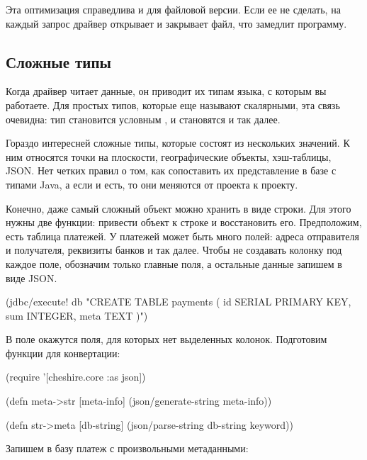 Эта оптимизация справедлива и для файловой версии. Если ее не сделать, на каждый запрос драйвер открывает и закрывает файл, что замедлит программу.

\subsection{Сложные типы}

Когда драйвер читает данные, он приводит их типам языка, с которым вы работаете. Для простых типов, которые еще называют скалярными, эта связь очевидна: тип  становится условным ,  и  становятся  и так далее.

Гораздо интересней сложные типы, которые состоят из нескольких значений. К ним относятся точки на плоскости, географические объекты, хэш-таблицы, JSON. Нет четких правил о том, как сопоставить их представление в базе с типами Java, а если и есть, то они меняются от проекта к проекту.

Конечно, даже самый сложный объект можно хранить в виде строки. Для этого нужны две функции: привести объект к строке и восстановить его. Предположим, есть таблица платежей. У платежей может быть много полей: адреса отправителя и получателя, реквизиты банков и так далее. Чтобы не создавать колонку под каждое поле, обозначим только главные поля, а остальные данные запишем в виде JSON.

\begin{english}
  \begin{clojure}
(jdbc/execute! db "CREATE TABLE payments (
  id SERIAL PRIMARY KEY,
  sum INTEGER,
  meta TEXT
)")
  \end{clojure}
\end{english}

В поле  окажутся поля, для которых нет выделенных колонок. Подготовим функции для конвертации:

\begin{english}
  \begin{clojure}
(require '[cheshire.core :as json])

(defn meta->str [meta-info]
  (json/generate-string meta-info))

(defn str->meta [db-string]
  (json/parse-string db-string keyword))
  \end{clojure}
\end{english}

Запишем в базу платеж с произвольными метаданными:

